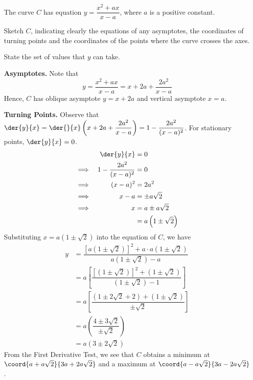 \documentclass{jhwhw}
\begin{document}

    \problem{}
        The curve $C$ has equation $y = \dfrac{x^2 + ax}{x - a}$, where $a$ is a positive constant.

        \medskip

        \noindent Sketch $C$, indicating clearly the equations of any asymptotes, the coordinates of turning points and the coordinates of the points where the curve crosses the axes.

        \medskip

        \noindent State the set of values that $y$ can take.

    \solution
        \textbf{Asymptotes.} Note that
        \begin{equation*}
            y = \dfrac{x^2 + ax}{x-a} = x + 2a + \dfrac{2a^2}{x-a}
        \end{equation*}
        Hence, $C$ has oblique asymptote $y = x + 2a$ and vertical asymptote $x = a$.

        \medskip

        \noindent \textbf{Turning Points.} Observe that $\der{y}{x} = \der{}{x} \left(x + 2a + \dfrac{2a^2}{x-a}\right) = 1 - \dfrac{2a^2}{(x-a)^2}$. For stationary points, $\der{y}{x} = 0$.
        \begin{alignat*}{2}
            &&\der{y}{x} &= 0\\
            \implies&&1 - \dfrac{2a^2}{(x-a)^2} &= 0\\
            \implies&&(x-a)^2 &= 2a^2\\
            \implies&&x-a &= \pm a\sqrt2\\
            \implies&&x &= a \pm a\sqrt2\\
            && &= a\left(1 \pm \sqrt2\right)
        \end{alignat*}
        Substituting $x = a\left(1 \pm \sqrt2\right)$ into the equation of $C$, we have
        \begin{align*}
            y &= \dfrac{\left[a\left(1 \pm \sqrt2\right)\right]^2 + a\cdot a\left(1 \pm \sqrt2\right)}{a\left(1 \pm \sqrt2\right) - a}\\
            &= a \left[\dfrac{\left[\left(1 \pm \sqrt2\right)\right]^2 + \left(1 \pm \sqrt2\right)}{\left(1 \pm \sqrt2\right) - 1}\right]\\
            &= a \left[\dfrac{\left(1 \pm 2\sqrt2 + 2\right) + \left(1 \pm \sqrt2\right)}{\pm \sqrt2}\right]\\
            &= a \left(\dfrac{4 \pm 3\sqrt2}{\pm \sqrt2}\right)\\
            &= a\left(3 \pm 2\sqrt2\right)
        \end{align*}
        From the First Derivative Test, we see that $C$ obtains a minimum at $\coord{a + a\sqrt2}{3a + 2a\sqrt2}$ and a maximum at $\coord{a - a\sqrt2}{3a - 2a\sqrt2}$. 
\end{document}
